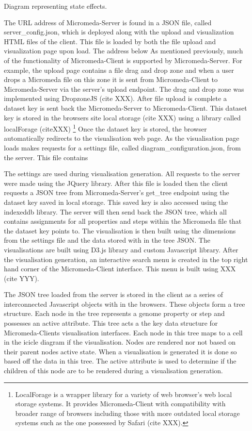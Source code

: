 Diagram representing state effects.

The URL address of Micromeda-Server is found in a JSON file, called server_config.json, which is deployed along with the upload and visualization HTML files of the client. This file is loaded by both the file upload and visualization page upon load. The address below As mentioned previously, much of the functionality of Micromeda-Client is supported by Micromeda-Server. For example, the upload page contains a file drag and drop zone and when a user drops a Micromeda file on this zone it is sent from Micromeda-Client to Micromeda-Server via the server's upload endpoint. The drag and drop zone was implemented using DropzoneJS (cite XXX). After file upload is complete a dataset key is sent back the Micromeda-Server to Micromeda-Client. This dataset key is stored in the browsers site local storage (cite XXX) using a library called localForage (citeXXX) \footnote{LocalForage is a wrapper library for a variety of web browser's web local storage systems. It provides Micromeda-Client with compatibility with broader range of browsers including those with more outdated local storage systems such as the one possessed by Safari (cite XXX).} Once the dataset key is stored, the browser automatically redirects to the visualisation web page. As the visualisation page loads makes requests for a settings file, called diagram_configuration.json, from the server. This file contains 


The settings are used during visualisation generation. All requests to the server were made using the JQuery library. After this file is loaded then the client requests a JSON tree from Micromeda-Server's get\_tree endpoint using the dataset key saved in local storage. This saved key is also accessed using the indexeddb library. The server will then send back the JSON tree, which all contains assignments for all properties and steps within the Micromeda file that the dataset key points to. The visualisation is then built using the dimensions from the settings file and the data stored with in the tree JSON. The visualisations are built using D3.js library and custom Javascript library. After the visualisation generation, an interactive search menu is created in the top right hand corner of the Micromeda-Client interface. This menu is built using XXX (cite YYY).


The JSON tree loaded from the server is stored in the client as a series of interconnected Javascript objects with in the browsers. These objects form a tree structure. Each node in the tree represents a genome property or step and possesses an active attribute. This tree acts a the key data structure for Micromeda-Clients visualisation interfaces. Each node in this tree maps to a cell in the icicle diagram if the visualisation. Nodes are rendered nor not based on their parent nodes active state. When a visualisation is generated it is done so based off the data in this tree. The active attribute is used to determine if the children of this node are to be rendered during a visualisation generation. 

